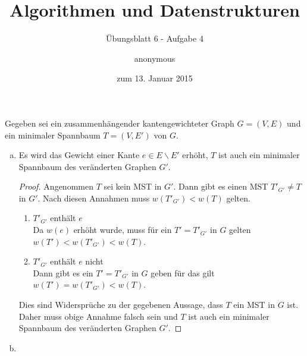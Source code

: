 \documentclass[a4paper]{scrartcl}
\title{Algorithmen und Datenstrukturen}
\subtitle{Übungsblatt 6 - Aufgabe 4}
\author{
    anonymous
}
\date{zum 13. Januar 2015}
\begin{document}
\maketitle

Gegeben sei ein zusammenhängender kantengewichteter Graph $G = (V, E)$ und ein
minimaler Spannbaum $T = (V, E')$ von $G$.

\begin{enumerate}[(a)]
    \item
        \begin{behaupt}
            Es wird das Gewicht einer Kante $e \in E \backslash E'$ erhöht,
            $T$ ist auch ein minimaler Spannbaum des veränderten Graphen $G'$.
        \end{behaupt}
        \begin{proof}
            Angenommen $T$ sei kein MST in $G'$.
            Dann gibt es einen MST $T'_{G'} \neq T$ in $G'$.
            Nach diesen Annahmen muss $w(T'_{G'}) < w(T)$ gelten.
            \begin{enumerate}
                \item $T'_{G'}$ enthält $e$ \\
                    Da $w(e)$ erhöht wurde, muss für ein $T' = T'_{G'}$ in $G$ gelten
                    $w(T') < w(T'_{G'}) < w(T)$.

                \item $T'_{G'}$ enthält $e$ nicht \\
                    Dann gibt es ein $T' = T'_{G'}$ in $G$ geben für das gilt
                    $w(T') = w(T'_{G'}) < w(T)$.
            \end{enumerate}
            Dies sind Widersprüche zu der gegebenen Aussage, dass $T$ ein MST
            in $G$ ist.
            Daher muss obige Annahme falsch sein und $T$ ist auch ein minimaler
            Spannbaum des veränderten Graphen $G'$.
        \end{proof}

    \item

\end{enumerate}
\end{document}
